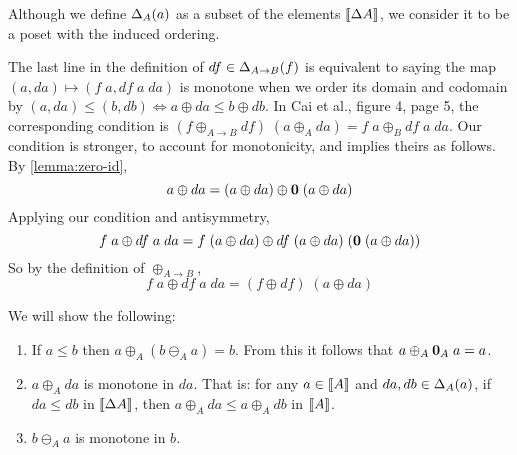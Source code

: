 \documentclass{rntz}
\begin{document}
Although we define $\Delta_{A}({a})$ as a subset of the elements ${\llbracket{\Delta{A}}\rrbracket}$,
we consider it to be a poset with the induced ordering.

The last line in the definition of $df \in \Delta_{A \to B}({f})$ is equivalent to
saying the map $(a, da) \mapsto (f\;a, df\;a\;da)$ is monotone when we order its
domain and codomain by $(a,da) \le (b,db) \iff a \oplus da \le b \oplus db$.
%
In Cai et al., figure 4, page 5, the corresponding condition is
$(f \oplus_{A \to B} df)\; (a \oplus_A da) = f\;a \oplus_B df\;a\;da$.
%
Our condition is stronger, to account for monotonicity, and implies theirs as
follows.
By \cref{lemma:zero-id},
\[ a \oplus da = (a \oplus da) \oplus \mathbf{0} \;(a \oplus da) \]
%
Applying our condition and antisymmetry,
\[
f\;a \oplus df\;a\;da =
f\;(a \oplus da) \oplus df \;(a \oplus da) \;(\mathbf{0} \;(a \oplus da))
\]
%
So by the definition of $\oplus_{A \to B}$,
\[
f\;a \oplus df\;a\;da = (f \oplus df) \; (a \oplus da)
\]



We will show the following:

\begin{enumerate}
\item If $a \le b$ then $a \oplus_A (b \ominus_A a) = b$. From this it
  follows that $a \oplus_A \mathbf{0}_A\; a = a$.

\item {} $a \oplus_A da$ is monotone in $da$. That is: for
  any $a \in {\llbracket{A}\rrbracket}$ and $da, db \in \Delta_{A}({a})$, if $da \le db$ in
  ${\llbracket{\Delta{A}}\rrbracket}$, then $a \oplus_A da \le a \oplus_A db$ in ${\llbracket{A}\rrbracket}$.

\item {} $b \ominus_A a$ is monotone in $b$.
\end{enumerate}
\end{document}
